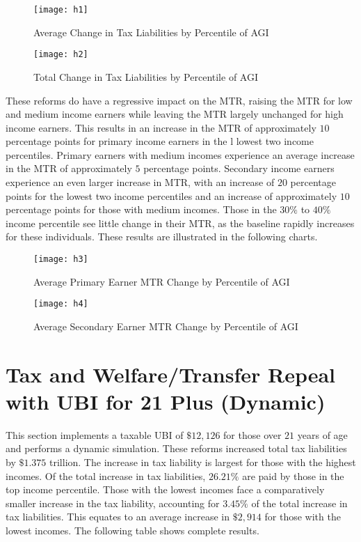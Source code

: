 \documentclass{article}
\begin{document}
\begin{figure}[H]
\centering
\caption{Average Change in Tax Liabilities by Percentile of AGI}
\texttt{[image: h1]}
\end{figure}

\begin{figure}[H]
\centering
\caption{Total Change in Tax Liabilities by Percentile of AGI}
\texttt{[image: h2]}
\end{figure}

These reforms do have a regressive impact on the MTR, raising the MTR for low and medium income earners while leaving the MTR largely unchanged for high income earners. This results in an increase in the MTR of approximately $10$ percentage points for primary income earners in the l lowest two income percentiles. Primary earners with medium incomes experience an average increase in the MTR of approximately $5$ percentage points. Secondary income earners experience an even larger increase in MTR, with an increase of $20$ percentage points for the lowest two income percentiles and an increase of approximately $10$ percentage points for those with medium incomes. Those in the $30\%$ to $40\%$ income percentile see little change in their MTR, as the baseline rapidly increases for these individuals. These results are illustrated in the following charts. 

\begin{figure}[H]
\centering
\caption{Average Primary Earner MTR Change by Percentile of AGI}
\texttt{[image: h3]}
\end{figure}

\begin{figure}[H]
\centering
\caption{Average Secondary Earner MTR Change by Percentile of AGI}
\texttt{[image: h4]}
\end{figure}

\section{Tax and Welfare/Transfer Repeal with UBI for 21 Plus (Dynamic)}
This section implements a taxable UBI of $\$12,126$ for those over $21$ years of age and performs a dynamic simulation. These reforms increased total tax liabilities by $\$1.375$ trillion. The increase in tax liability is largest for those with the highest incomes. Of the total increase in tax liabilities, $26.21\%$ are paid by those in the top income percentile. Those with the lowest incomes face a comparatively smaller increase in the tax liability, accounting for $3.45\%$ of the total increase in tax liabilities. This equates to an average increase in $\$2,914$ for those with the lowest incomes. The following table shows complete results.
\end{document}
